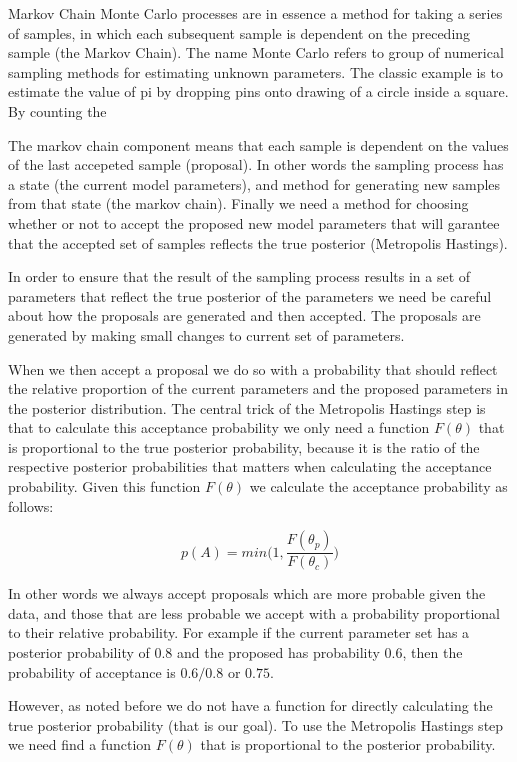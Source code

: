 \documentclass[12pt,a4paper]{article}
\numberwithin{equation}{section}
\begin{document}
Markov Chain Monte Carlo processes are in essence a method for taking a series of samples, in which each subsequent
sample is dependent on the preceding sample (the Markov Chain). 
The name Monte Carlo refers to group of numerical sampling methods for estimating unknown parameters. 
The classic example is to estimate the value of pi by dropping pins onto drawing of a circle inside a square. 
By counting the 

The markov chain component means that each sample is dependent on the values of the last accepeted sample (proposal). 
In other words the sampling process has a state (the current model parameters), and method for generating new samples
from that state (the markov chain). Finally we need a method for choosing whether or not to accept the proposed new 
model parameters that will garantee that the accepted set of samples reflects the true posterior (Metropolis Hastings).

In order to ensure that the result of the sampling process results in a set of parameters that reflect the true posterior
of the parameters we need be careful about how the proposals are generated and then accepted. The proposals are generated
by making small changes to current set of parameters.

When we then accept a proposal we do so with a probability that should reflect the relative proportion of the current parameters
and the proposed parameters in the posterior distribution. The central trick of the Metropolis Hastings step is that to 
calculate this acceptance probability we only need a function $F(\theta)$ that is proportional to the true posterior probability, 
because it is the ratio of the respective posterior probabilities that matters when calculating the acceptance probability.
Given this function $F(\theta)$ we calculate the acceptance probability as follows: 

\begin{equation}
p(A) = min \big( 1, \frac{ F(\theta_p) } { F(\theta_c) } \big)
\end{equation}

In other words we always accept proposals which are more probable given the data, and those that are less probable we accept with
a probability proportional to their relative probability. For example if the current parameter set has a posterior probability of $0.8$ 
and the proposed has probability $0.6$, then the probability of acceptance is $0.6/0.8$ or $0.75$.

However, as noted before we do not have a function for directly calculating the true posterior probability (that is our goal). 
To use the Metropolis Hastings step we need find a function $F(\theta)$ that is proportional to the posterior probability.
\end{document}
